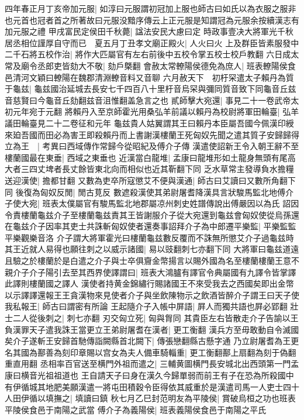 四年春正月丁亥帝加元服|{
	如淳曰元服謂初冠加上服也師古曰如氏以為衣服之服非也元首也冠者首之所著故曰元服没黯序傳云上正元服是知謂冠為元服余按續漢志有加元服之禮}
甲戌富民定侯田千秋薨|{
	諡法安民大慮曰定}
時政事壹决大將軍光千秋居丞相位謹厚自守而已　夏五月丁丑孝文廟正殿火|{
	人火曰火}
上及群臣皆素服發中二千石將五校作治|{
	將作大匹屬官有左右前後中五校令掌五校士校戶教翻}
六日成太常及廟令丞郎吏皆劾大不敬|{
	劾戶槩翻}
會赦太常轑陽侯德免為庶人|{
	班表轑陽侯食邑清河文穎曰轑陽在魏郡清淵轑音料又音聊}
六月赦天下　初杅罙遣太子賴丹為質于龜兹|{
	龜兹國治延城去長安七千四百八十里杅音烏罙與彌同質音致下同龜音丘兹音慈賢曰今龜音丘劾翻兹音沮惟翻盖急言之也}
貳師擊大宛還|{
	事見二十一卷武帝太初元年宛于元翻}
將賴丹入至京師霍光用桑弘羊前議以賴丹為校尉將軍田輪臺|{
	弘羊議田輪臺見二十二卷征和元年}
龜兹貴人姑翼謂其王曰賴丹本臣屬吾國今佩漢印綬來廹吾國而田必為害王即殺賴丹而上書謝漢樓蘭王死匈奴先聞之遣其質子安歸歸得立為王　|{
	考異曰西域傳作常歸今從昭紀及傅介子傳}
漢遣使詔新王令入朝王辭不至樓蘭國最在東垂|{
	西域之東垂也}
近漢當白龍堆|{
	孟康曰龍堆形如土龍身無頭有尾高大者三四丈埤者長丈餘皆東北向而相似也近其靳翻下同}
乏水草常主發導負水擔糧送迎漢使|{
	擔都甘翻}
又數為吏卒所寇懲艾不便與漢通|{
	師古曰艾讀曰又數所角翻下同}
後復為匈奴反閒|{
	閒古莧反}
數遮殺漢使其弟尉屠耆降漢具言狀駿馬監北地傅介子使大宛|{
	班表太僕屬官有駿馬監北地郡屬凉州刺史姓譜傳說出傅嚴因以為氏}
詔因令責樓蘭龜兹介子至樓蘭龜兹責其王皆謝服介子從大宛還到龜兹會匈奴使從烏孫還在龜兹介子因率其吏士共誅斬匈奴使者還奏事詔拜介子為中郎遷平樂監|{
	平樂監監平樂觀樂音洛}
介子謂大將軍霍光曰樓蘭龜兹數反覆而不誅無所懲艾介子過龜兹時其王近就人易得也願往刺之以威示諸國|{
	易以豉翻刺七亦翻下同}
大將軍曰龜兹道遠且驗之於樓蘭於是白遣之介子與士卒俱齎金幣揚言以賜外國為名至樓蘭樓蘭王意不親介子介子陽引去至其西界使譯謂曰|{
	班表大鴻臚有譯官令典屬國有九譯令皆掌譯此譯則樓蘭國之譯人}
漢使者持黄金錦繡行賜諸國王不來受我去之西國矣即出金幣以示譯譯還報王王貪漢物來見使者介子與坐飲陳物示之飲酒皆醉介子謂王曰天子使我私報王|{
	師古曰謂密有所論}
王起隨介子入帳中屏語|{
	屛人而獨共語也屛必郢翻}
壯士二人從後刺之|{
	刺七亦翻}
刃交匈立死|{
	匈與胷同}
其貴臣左右皆散走介子告諭以王負漢罪天子遣我誅王當更立王弟尉屠耆在漢者|{
	更工衡翻}
漢兵方至毋敢動自令滅國矣介子遂斬王安歸首馳傳詣闕縣首北闕下|{
	傳張戀翻縣古懸字通}
乃立尉屠耆為王更名其國為鄯善為刻印章賜以宫女為夫人備車騎輜重|{
	更工衡翻鄯上扇翻為刻于偽翻重直用翻}
丞相率百官送至横門外祖而遣之|{
	三輔黄圖横門長安城北出西頭第一門孟康曰横音光祖祖道也}
王自請天子曰身在漢久今歸單弱而前王有子在恐為所殺國中有伊循城其地肥美願漢遣一將屯田積穀令臣得依其威重於是漢遣司馬一人吏士四十人田伊循以填撫之|{
	填讀曰鎮}
秋七月乙巳封范明友為平陵侯|{
	賞破烏桓之功也班表平陵侯食邑于南陽之武當}
傅介子為義陽侯|{
	班表義陽侯食邑于南陽之平氏}


